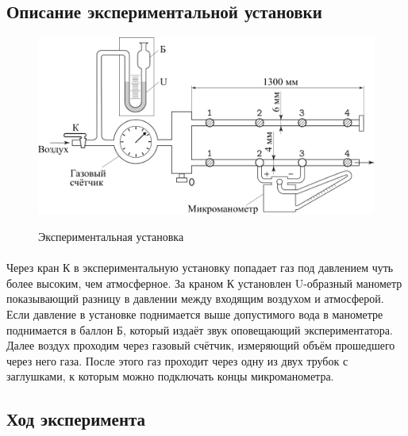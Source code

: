 \documentclass[a4paper,12pt]{article} %
\begin{document}
\subsection{Описание экспериментальной установки}

\begin{figure}
\centering
\includegraphics[width=0.7\linewidth]{setup.png}
\label{fig:setup}
\caption{Экспериментальная установка}
\end{figure}

\paragraph{}
Через кран К в экспериментальную установку попадает газ под давлением чуть более высоким, чем атмосферное.
За краном К установлен U-образный манометр показывающий разницу в давлении между входящим воздухом и атмосферой. 
Если давление в установке поднимается выше допустимого вода в манометре поднимается в баллон Б, который издаёт звук оповещающий экспериментатора.
Далее воздух проходим через газовый счётчик, измеряющий объём прошедшего через него газа.
После этого газ проходит через одну из двух трубок с заглушками, к которым можно подключать концы микроманометра.


\subsection{Ход эксперимента}
\end{document}
